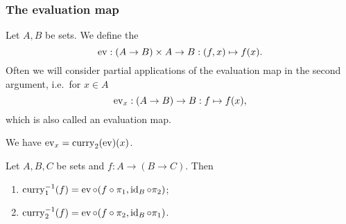 \subsubsection{The evaluation map}
\begin{definition}
Let $A,B$ be sets. We define the 
\[ \operatorname{ev}: (A\to B)\times A \to B: (f,x) \mapsto f(x). \]
Often we will consider partial applications of the evaluation map in the second argument, i.e.\ for $x\in A$
\[ \operatorname{ev}_x: (A\to B) \to B: f\mapsto f(x), \]
which is also called an evaluation map.
\end{definition}
We have $\operatorname{ev}_x = \operatorname{curry}_2(\operatorname{ev})(x)$.

\begin{lemma} \label{inverseCurryLemma}
Let $A,B,C$ be sets and $f: A\to (B\to C)$. Then
\begin{enumerate}
\item $\operatorname{curry}_1^{-1}(f) = \operatorname{ev}\circ (f\circ \pi_1, \operatorname{id}_B\circ \pi_2)$;
\item $\operatorname{curry}_2^{-1}(f) = \operatorname{ev}\circ (f\circ\pi_2, \operatorname{id}_B\circ\pi_1)$.
\end{enumerate}
\end{lemma}

